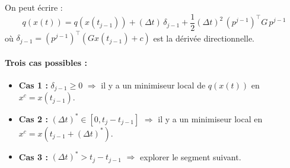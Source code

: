 On peut écrire :
\begin{equation}
    q(x(t)) = q(x(t_{j-1})) + (\Delta t) \, \delta_{j-1} + \frac{1}{2} (\Delta t)^2 \, (p^{j-1})^\top G \, p^{j-1}
\end{equation}
où $\delta_{j-1} = (p^{j-1})^\top (G x(t_{j-1}) + c)$ est la dérivée directionnelle.

\paragraph{Trois cas possibles :}
\begin{itemize}
    \item \textbf{Cas 1 :} $\delta_{j-1} \ge 0$ $\Rightarrow$ il y a un minimiseur local de $q(x(t))$ en $x^c = x(t_{j-1})$.
    \item \textbf{Cas 2 :} $(\Delta t)^* \in [0, t_j - t_{j-1}]$ $\Rightarrow$ il y a un minimiseur local en $x^c = x(t_{j-1} + (\Delta t)^*)$.
    \item \textbf{Cas 3 :} $(\Delta t)^* > t_j - t_{j-1}$ $\Rightarrow$ explorer le segment suivant.
\end{itemize}

